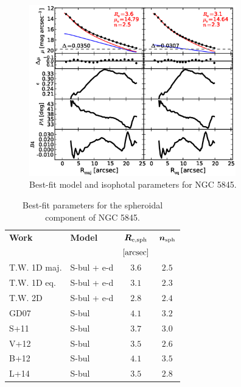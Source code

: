 \documentclass[preprint2]{emulateapj}
\newcommand{\fitfigurewidth}{0.8\textwidth}
\begin{document}
  \begin{figure}[h]
  \begin{center}
  \includegraphics[width=\fitfigurewidth]{images/n5845_1Dfit.eps}
  \caption{Best-fit model and isophotal parameters for NGC 5845.}
  \end{center}
  \end{figure}

  \begin{table}[h]
  \small
  \caption{Best-fit parameters for the spheroidal component of NGC 5845.}
  \begin{center}
  \begin{tabular}{llcc}
  \hline
  {\bf Work} & {\bf Model}   & $\bm R_{\rm e,sph}$    & $\bm n_{\rm sph}$ \\
    &  &  $[\rm arcsec]$ & \\
  \hline
  T.W. 1D maj. & S-bul + e-d & $3.6$  &  $2.5$ \\
  T.W. 1D eq.  & S-bul + e-d & $3.1$  &  $2.3$ \\
  T.W. 2D      & S-bul + e-d & $2.8$  &  $2.4$ \\
  \hline
  GD07      & S-bul & $4.1$  &  $3.2$ \\
  S+11      & S-bul & $3.7$  &  $3.0$ \\
  V+12      & S-bul & $3.5$  &  $2.6$ \\
  B+12      & S-bul & $4.1$  &  $3.5$ \\
  L+14      & S-bul & $3.5$  &  $2.8$ \\
  \hline
  \end{tabular}
  \end{center}
  \label{tab:n5845}
  \end{table}
\end{document}
